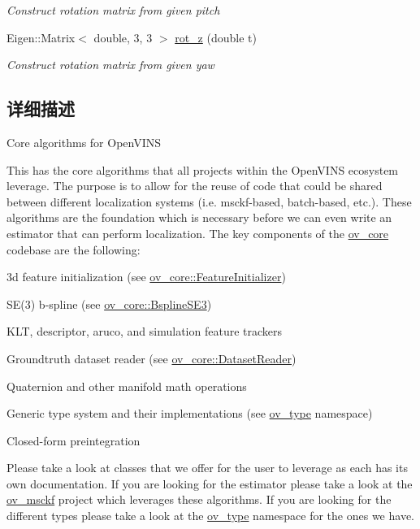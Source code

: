 \begin{DoxyCompactItemize}
\begin{DoxyCompactList}\small\item\em Construct rotation matrix from given pitch \end{DoxyCompactList}\item 
Eigen\+::\+Matrix$<$ double, 3, 3 $>$ \hyperlink{namespaceov__core_a512a53c9e1519a8e202277db433d37d1}{rot\+\_\+z} (double t)
\begin{DoxyCompactList}\small\item\em Construct rotation matrix from given yaw \end{DoxyCompactList}\end{DoxyCompactItemize}


\subsection{详细描述}
Core algorithms for Open\+V\+I\+NS 

This has the core algorithms that all projects within the Open\+V\+I\+NS ecosystem leverage. The purpose is to allow for the reuse of code that could be shared between different localization systems (i.\+e. msckf-\/based, batch-\/based, etc.). These algorithms are the foundation which is necessary before we can even write an estimator that can perform localization. The key components of the \hyperlink{namespaceov__core}{ov\+\_\+core} codebase are the following\+:


\begin{DoxyItemize}
\item 3d feature initialization (see \hyperlink{classov__core_1_1FeatureInitializer}{ov\+\_\+core\+::\+Feature\+Initializer})
\item S\+E(3) b-\/spline (see \hyperlink{classov__core_1_1BsplineSE3}{ov\+\_\+core\+::\+Bspline\+S\+E3})
\item K\+LT, descriptor, aruco, and simulation feature trackers
\item Groundtruth dataset reader (see \hyperlink{classov__core_1_1DatasetReader}{ov\+\_\+core\+::\+Dataset\+Reader})
\item Quaternion and other manifold math operations
\item Generic type system and their implementations (see \hyperlink{namespaceov__type}{ov\+\_\+type} namespace)
\item Closed-\/form preintegration \cite{Eckenhoff2019IJRR}
\end{DoxyItemize}

Please take a look at classes that we offer for the user to leverage as each has its own documentation. If you are looking for the estimator please take a look at the \hyperlink{namespaceov__msckf}{ov\+\_\+msckf} project which leverages these algorithms. If you are looking for the different types please take a look at the \hyperlink{namespaceov__type}{ov\+\_\+type} namespace for the ones we have. 


